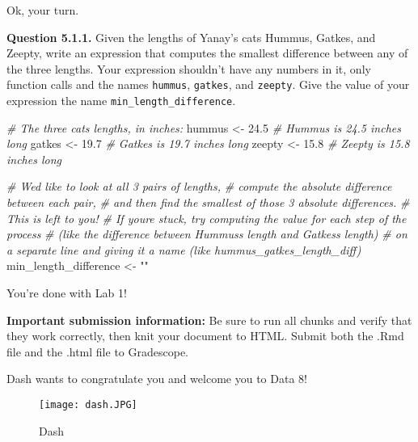 \documentclass[
]{article}
\newenvironment{Shaded}{\begin{snugshade}}{\end{snugshade}}
\newcommand{\CommentTok}[1]{\textcolor[rgb]{0.56,0.35,0.01}{\textit{#1}}}
\newcommand{\FloatTok}[1]{\textcolor[rgb]{0.00,0.00,0.81}{#1}}
\newcommand{\NormalTok}[1]{#1}
\newcommand{\OtherTok}[1]{\textcolor[rgb]{0.56,0.35,0.01}{#1}}
\newcommand{\StringTok}[1]{\textcolor[rgb]{0.31,0.60,0.02}{#1}}
\begin{document}
Ok, your turn.

\textbf{Question 5.1.1.} Given the lengths of Yanay's cats Hummus,
Gatkes, and Zeepty, write an expression that computes the smallest
difference between any of the three lengths. Your expression shouldn't
have any numbers in it, only function calls and the names
\texttt{hummus}, \texttt{gatkes}, and \texttt{zeepty}. Give the value of
your expression the name \texttt{min\_length\_difference}.

\begin{Shaded}
\begin{Highlighting}[]
\CommentTok{\# The three cats\textquotesingle{} lengths, in inches:}
\NormalTok{hummus }\OtherTok{\textless{}{-}} \FloatTok{24.5}  \CommentTok{\# Hummus is 24.5 inches long}
\NormalTok{gatkes }\OtherTok{\textless{}{-}} \FloatTok{19.7}  \CommentTok{\# Gatkes is 19.7 inches long}
\NormalTok{zeepty }\OtherTok{\textless{}{-}} \FloatTok{15.8}  \CommentTok{\# Zeepty is 15.8 inches long}
             
\CommentTok{\# We\textquotesingle{}d like to look at all 3 pairs of lengths, }
\CommentTok{\# compute the absolute difference between each pair, }
\CommentTok{\# and then find the smallest of those 3 absolute differences.  }
\CommentTok{\# This is left to you!  }
\CommentTok{\# If you\textquotesingle{}re stuck, try computing the value for each step of the process }
\CommentTok{\# (like the difference between Hummus\textquotesingle{}s length and Gatkes\textquotesingle{}s length) }
\CommentTok{\# on a separate line and giving it a name (like hummus\_gatkes\_length\_diff)}
\NormalTok{min\_length\_difference }\OtherTok{\textless{}{-}} \StringTok{""}
\end{Highlighting}
\end{Shaded}

You're done with Lab 1!

\textbf{Important submission information:} Be sure to run all chunks and
verify that they work correctly, then knit your document to HTML. Submit
both the .Rmd file and the .html file to Gradescope.

Dash wants to congratulate you and welcome you to Data 8!

\begin{figure}
\centering
\texttt{[image: dash.JPG]}
\caption{Dash}
\end{figure}
\end{document}
